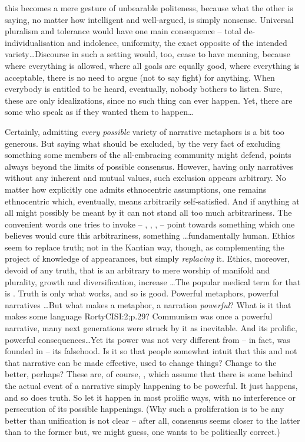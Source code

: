 this becomes a mere gesture of unbearable politeness, because what the other is
saying, no matter how intelligent and well-argued, is simply nonsense.
Universal pluralism and tolerance would have one main consequence -- total
de-individualisation and indolence, uniformity, the exact opposite of the
intended variety\ldots Discourse in such a setting would, too, cease to have
meaning, because where everything is allowed, where all goals are equally good,
where everything is acceptable, there is no need to argue (not to say fight) for
anything. When everybody is entitled to be heard, eventually, nobody bothers to
listen. Sure, these are only idealizations, since no such
thing can ever happen.  Yet, there are some who speak as if they wanted them to
happen\ldots

\pa Certainly, admitting {\em every possible} variety of narrative metaphors is
a bit too generous. But saying what should be excluded, by the very fact of
excluding something some members of the all-embracing community might defend,
points always beyond the limits of possible consensus. However, having only
narratives without any inherent and mutual values, such exclusion appears
arbitrary.  No matter how explicitly one admits ethnocentric assumptions, one
remains ethnocentric which, eventually, means arbitrarily self-satisfied.  And
if anything at all might possibly be meant by  it can not stand all
too much arbitrariness.  The convenient words one tries to invoke --
, , ,  --
point towards something which one believes would cure this arbitrariness,
something \ldots fundamentally human.  Ethics seem to replace truth; not in the
Kantian way, though, as complementing the project of knowledge of appearances,
but simply {\em replacing} it.  Ethics, moreover, devoid of any truth, that is
an arbitrary  to mere worship of manifold and plurality, growth and
diversification, increase \ldots The popular medical term for that is
.  Truth is only what works, and so is good.  Powerful metaphors,
powerful narratives \ldots But what makes a metaphor, a narration {\em
  powerful}?  What is it that makes some language \citet{strike also the next
  generation as inevitable}{RortyCIS}{I:2;p.29}?  Communism was once a powerful
narrative, many next generations were struck by it as inevitable. And its
prolific, powerful consequences\ldots Yet its power was not very different from
-- in fact, was founded in -- its falsehood.  Is it so that people somewhat
intuit that this and not that narrative can be made effective, used to change
things?  Change to the better, perhaps?  These are, of course, , which assume that there is some  behind the actual event
of a narrative simply happening to be powerful. It just happens, and so does truth.
So let it happen in most prolific ways, with no interference or persecution of
its possible happenings.  (Why such a proliferation is to be any better than
unification is not clear -- after all, consensus seems closer to the latter than
to the former but, we might guess, one wants to be politically correct.)

